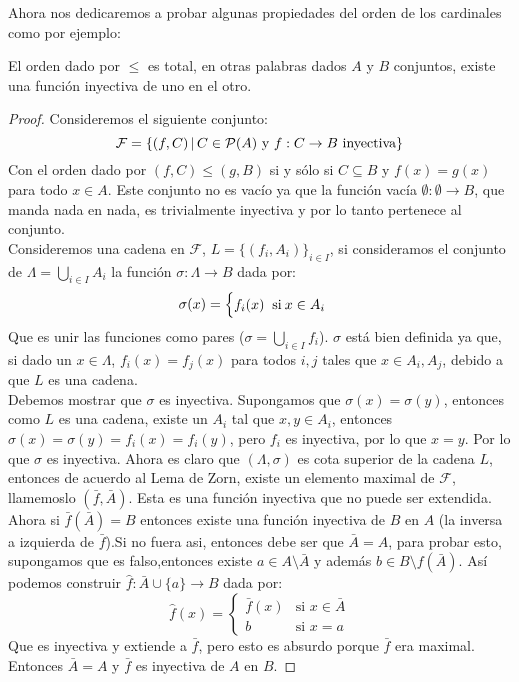 \documentclass[12pt,a4paper]{book}
\begin{document}
Ahora nos dedicaremos a probar algunas propiedades del orden de los cardinales como por ejemplo:
\begin{teo}
El orden dado por  $\leq$ es total, en otras palabras dados $A$ y $B$ conjuntos, existe una función inyectiva de uno en el otro.
\begin{proof}
Consideremos el siguiente conjunto:
$$ \mathcal{F} = \{ (f,C) \,\vert\, C \in \P(A) \mbox{ y } f: C \rightarrow B \mbox{ inyectiva} \}$$
Con el orden dado por $(f,C) \leq (g,B)$ si y sólo si $C \subseteq B$ y $f(x) = g(x)$ para todo $x \in A$.
Este conjunto no es vacío ya que la función vacía $\emptyset:\emptyset \rightarrow B$, que manda nada en nada, es trivialmente inyectiva y por lo tanto pertenece al conjunto.\\
Consideremos una cadena en $\mathcal{F}$, $L = \{ (f_i,A_i) \}_{i \in I}$, si consideramos el conjunto de $ \Lambda = \bigcup_{i \in I} A_i$ la función $\sigma: \Lambda \rightarrow B$ dada por:
$$ \sigma(x) =
\begin{cases}
f_i(x) \;\si x \in A_i
\end{cases}$$
Que es unir las funciones como pares ($\sigma = \bigcup_{i\in I} f_i$). $\sigma$ está bien definida ya que, si dado un $x\in \Lambda$, $f_i(x)=f_j(x)$ para todos $i,j$ tales que $x \in A_i, A_j$, debido a que $L$ es una cadena.\\
Debemos mostrar que $\sigma$ es inyectiva. Supongamos que $\sigma(x)=\sigma(y)$, entonces como $L$ es una cadena, existe un $A_i$ tal que $x,y \in A_i$, entonces $\sigma(x)=\sigma(y)=f_i(x)=f_i(y)$, pero $f_i$ es inyectiva, por lo que $x=y$. Por lo que $\sigma$ es inyectiva. Ahora es claro que $(\Lambda, \sigma)$ es cota superior de la cadena $L$, entonces de acuerdo al Lema de Zorn, existe un elemento maximal de $\mathcal{F}$, llamemoslo $ (\bar{f},\bar{A})$. Esta es una función inyectiva que no puede ser extendida.\\
Ahora si $\bar{f}(\bar{A})=B$ entonces existe una función inyectiva de $B$ en $A$ (la inversa a izquierda de $\bar{f}$).Si no fuera asi, entonces debe ser que $\bar{A} = A$, para probar esto, supongamos que es falso,entonces existe $a \in A \setminus \bar{A}$ y además $b\in B \setminus f(\bar{A})$. Así podemos construir $\hat{f}: \bar{A} \cup \{a\} \rightarrow B$  dada por:
$$ \hat{f}(x) = 
\begin{cases}
\bar{f}(x) &\mbox{si } x\in \bar{A}\\
b &\mbox{si } x = a
\end{cases}$$
Que es inyectiva y extiende a $\bar{f}$, pero esto es absurdo porque $\bar{f}$ era maximal. Entonces $\bar{A}=A$ y $\bar{f}$ es inyectiva de $A$ en $B$.
\end{proof}
\end{teo}
\end{document}
